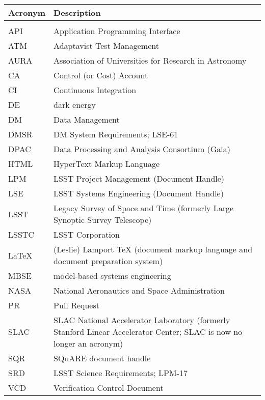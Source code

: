 \documentclass[]{spie}
\begin{document}
\begin{tabular}{p{}p{}}\hline
\textbf{Acronym} & \textbf{Description}  \\\hline

 &  \\\hline
API & Application Programming Interface \\\hline
ATM & Adaptavist Test Management \\\hline
AURA & Association of Universities for Research in Astronomy \\\hline
CA & Control (or Cost) Account \\\hline
CI & Continuous Integration \\\hline
DE & dark energy \\\hline
DM & Data Management \\\hline
DMSR & DM System Requirements; LSE-61 \\\hline
DPAC & Data Processing and Analysis Consortium (Gaia) \\\hline
HTML & HyperText Markup Language \\\hline
LPM & LSST Project Management (Document Handle) \\\hline
LSE & LSST Systems Engineering (Document Handle) \\\hline
LSST & Legacy Survey of Space and Time (formerly Large Synoptic Survey Telescope) \\\hline
LSSTC & LSST Corporation \\\hline
LaTeX & (Leslie) Lamport TeX (document markup language and document preparation system) \\\hline
MBSE & model-based systems engineering \\\hline
NASA & National Aeronautics and Space Administration \\\hline
PR & Pull Request \\\hline
SLAC & SLAC National Accelerator Laboratory (formerly Stanford Linear Accelerator Center; SLAC is now no longer an acronym) \\\hline
SQR & SQuARE document handle \\\hline
SRD & LSST Science Requirements; LPM-17 \\\hline
VCD & Verification Control Document \\\hline
\end{tabular}
\end{document}
